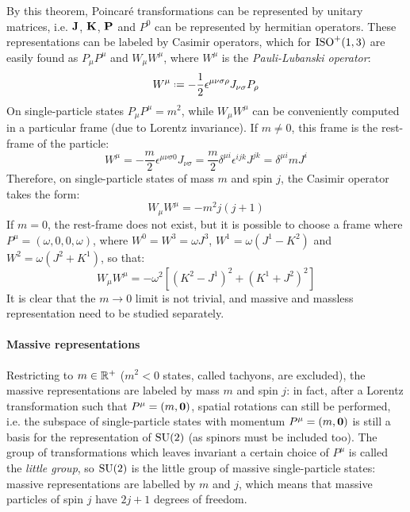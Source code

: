 By this theorem, Poincaré transformations can be represented by unitary matrices, i.e. $ \mathbf{J} $, $ \mathbf{K} $, $ \mathbf{P} $ and $ P^0 $ can be represented by hermitian operators. These representations can be labeled by Casimir operators, which for $ \mathrm{ISO}^+(1,3) $ are easily found as $ P_\mu P^\mu $ and $ W_\mu W^\mu $, where $ W^\mu $ is the \textit{Pauli-Lubanski operator}:
\begin{equation}
  W^\mu \defeq -\frac{1}{2} \epsilon^{\mu \nu \sigma \rho} J_{\nu \sigma} P_\rho
  \label{eq:1.56}
\end{equation}
On single-particle states $ P_\mu P^\mu = m^2 $, while $ W_\mu W^\mu $ can be conveniently computed in a particular frame (due to Lorentz invariance). If $ m \neq 0 $, this frame is the rest-frame of the particle:
\begin{equation*}
  W^\mu = - \frac{m}{2} \epsilon^{\mu \nu \sigma 0} J_{\nu \sigma} = \frac{m}{2} \delta^{\mu i} \epsilon^{ijk} J^{jk} = \delta^{\mu i} m J^i
\end{equation*}
Therefore, on single-particle states of mass $ m $ and spin $ j $, the Casimir operator takes the form:
\begin{equation}
  W_\mu W^\mu = - m^2 j \left( j + 1 \right)
  \label{eq:1.57}
\end{equation}
If $ m = 0 $, the rest-frame does not exist, but it is possible to choose a frame where $ P^\mu = (\omega,0,0,\omega) $, where $ W^0 = W^3 = \omega J^3 $, $ W^1 = \omega \left( J^1 - K^2 \right) $ and $ W^2 = \omega \left( J^2 + K^1 \right) $, so that:
\begin{equation}
  W_\mu W^\mu = - \omega^2 \left[ \left( K^2 - J^1 \right)^2 + \left( K^1 + J^2 \right)^2 \right]
  \label{eq:1.58}
\end{equation}
It is clear that the $ m \rightarrow 0 $ limit is not trivial, and massive and massless representation need to be studied separately.

\paragraph{Massive representations}

Restricting to $ m \in \mathbb{R}^+ $ ($ m^2 < 0 $ states, called tachyons, are excluded), the massive representations are labeled by mass $ m $ and spin $ j $: in fact, after a Lorentz transformation such that $ P^\mu = (m,\mathbf{0}) $, spatial rotations can still be performed, i.e. the subspace of single-particle states with momentum $ P^\mu = (m,\mathbf{0}) $ is still a basis for the representation of $ \mathrm{SU}(2) $ (as spinors must be included too). The group of transformations which leaves invariant a certain choice of $ P^\mu $ is called the \textit{little group}, so $ \mathrm{SU}(2) $ is the little group of massive single-particle states: massive representations are labelled by $ m $ and $ j $, which means that massive particles of spin $ j $ have $ 2j + 1 $ degrees of freedom.

